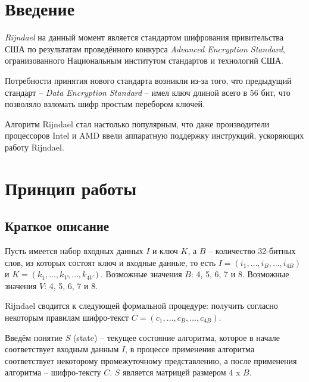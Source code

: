 \section{Введение}

    \textit{Rijndael} на данный момент является стандартом шифрования привительства США по
    результатам проведённого конкурса \textit{Advanced Encryption Standard}, огранизованного
    Национальным институтом стандартов и технологий США.

    Потребности принятия нового стандарта возникли из-за того, что предыдущий стандарт --
    \textit{Data Encryption Standard} -- имел ключ длиной всего в 56 бит, что позволяло взломать
    шифр простым перебором ключей.

    Алгоритм Rijndael стал настолько популярным, что даже производители процессоров Intel и AMD
    ввели аппаратную поддержку инструкций, ускоряющих работу Rijndael.

\section{Принцип работы}
\subsection{Краткое описание}

    Пусть имеется набор входных данных $I$ и ключ $K$, а $B$ -- количество 32-битных слов, из которых
    состоят ключ и входные данные, то есть $I = (i_1, \dots, i_{B}, \dots, i_{4B})$ и
    $K = (k_1, \dots, k_{V}, \dots, k_{4V})$.
    Возможные значения $B$: 4, 5, 6, 7 и 8. Возможные значения $V$: 4, 5, 6, 7 и 8.

    Rijndael сводится к следующей формальной процедуре: получить согласно некоторым правилам
    шифро-текст $C = (c_1, \dots, c_{B}, \dots, c_{4B})$.

    Введём понятие $S$ (state) -- текущее состояние алгоритма, которое в начале соответствует входным данным $I$,
    в процессе применения алгоритма соответствует некоторому промежуточному представлению,
    а после применения алгоритма -- шифро-тексту $C$. $S$ является матрицей размером $4$ x $B$.

